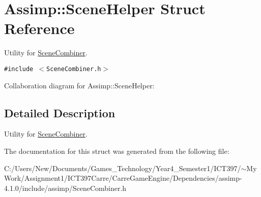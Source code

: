 \hypertarget{struct_assimp_1_1_scene_helper}{
\section{Assimp::SceneHelper Struct Reference}
\label{struct_assimp_1_1_scene_helper}
}
Utility for \hyperlink{class_assimp_1_1_scene_combiner}{SceneCombiner}.  


{\tt \#include $<$SceneCombiner.h$>$}

Collaboration diagram for Assimp::SceneHelper:

\subsection{Detailed Description}
Utility for \hyperlink{class_assimp_1_1_scene_combiner}{SceneCombiner}. 

The documentation for this struct was generated from the following file:\begin{CompactItemize}
\item 
C:/Users/New/Documents/Games\_\-Technology/Year4\_\-Semester1/ICT397/$\sim$My Work/Assignment1/ICT397Carre/CarreGameEngine/Dependencies/assimp-4.1.0/include/assimp/SceneCombiner.h\end{CompactItemize}
